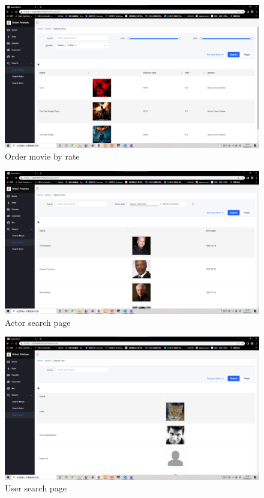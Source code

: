 \begin{CJK*}{UTF8}{gbsn}
    \begin{figure}[htbp]
    \centering
    \includegraphics[width=1\textwidth]{res_search7.png}
    \caption{Order movie by rate}
    \end{figure}
    
    \begin{figure}[htbp]
    \centering
    \includegraphics[width=1\textwidth]{res_search8.png}
    \caption{Actor search page}
    \end{figure}
    
    \begin{figure}[htbp]
    \centering
    \includegraphics[width=1\textwidth]{res_search9.png}
    \caption{User search page}
    \end{figure}
    

\end{CJK*}

